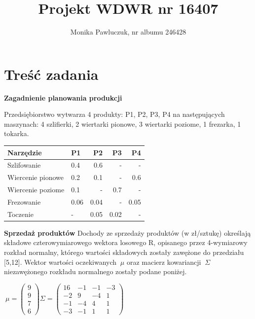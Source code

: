 \documentclass[11pt]{article} %
\title{Projekt WDWR nr 16407}
\author{Monika Pawluczuk, nr albumu 246428}
\begin{document}
\maketitle

\section{Treść zadania}

\textbf{Zagadnienie planowania produkcji}

Przedsiębiorstwo wytwarza 4 produkty: P1, P2, P3, P4 na następujących maszynach: 4 szlifierki, 2 wiertarki pionowe, 3 wiertarki poziome, 1 frezarka, 1 tokarka. 

\begin{center}
    \begin{tabular}{ | l | l | r | r | r | }
    \hline
    Narzędzie & P1 & P2 & P3 & P4 \\ \hline
    Szlifowanie & 0.4 & 0.6 & - & - \\
    Wiercenie pionowe & 0.2 & 0.1 & - & 0.6 \\
    Wiercenie poziome & 0.1 & - & 0.7 & - \\
    Frezowanie & 0.06 & 0.04 & - & 0.05 \\
    Toczenie & - & 0.05 & 0.02 & - \\ \hline
    \end{tabular}
\end{center}

\textbf{Sprzedaż produktów}
Dochody ze sprzedaży produktów (w zł/sztukę) określają składowe czterowymiarowego wektora losowego R, opisanego przez 4-wymiarowy rozkład normalny, którego wartości składowych zostały zawężone do przedziału [5,12]. Wektor wartości oczekiwanych $\ \mu $ oraz macierz kowariancji $\ \Sigma $ niezawężonego rozkładu normalnego zostały podane poniżej.

\begin{center}
$\ \mu = \begin{pmatrix}
9\\ 
9\\ 
7\\ 
6
\end{pmatrix} 
\Sigma = \begin{pmatrix}
16 & -1 & -1 & -3 \\ 
-2 & 9 & -4 & 1 \\ 
-1 & -4 & 4 & 1\\ 
-3 & -1 & 1 & 1
\end{pmatrix}$

\end{center}
\end{document}
